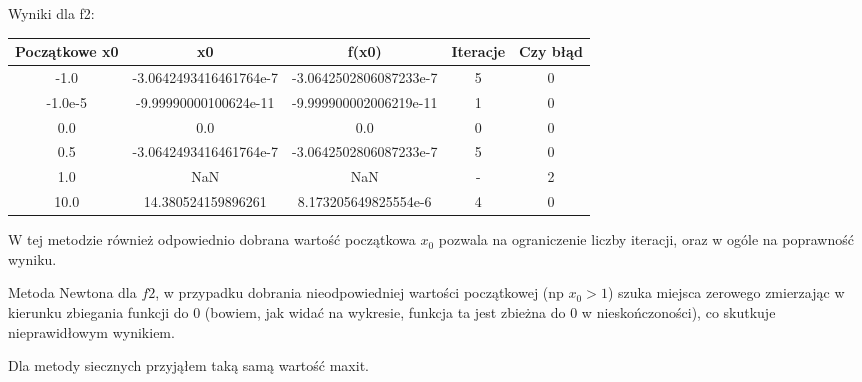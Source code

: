 \documentclass[15pt, a4paper]{article}
\begin{document}
\noindent Wyniki dla f2:
\begin{table}[ht]
\begin{adjustbox}{max width=\textwidth}
\begin{tabular}{|c|c|c|c|c|}
    \hline
    \textbf{Początkowe x0} & \textbf{x0} & \textbf{f(x0)} & \textbf{Iteracje} & \textbf{Czy błąd} \\
    \hline
    -1.0 & -3.0642493416461764e-7 & -3.0642502806087233e-7 & 5 & 0 \\
    \hline
    -1.0e-5 & -9.99990000100624e-11 & -9.999900002006219e-11 & 1 & 0 \\
    \hline
    0.0 & 0.0 & 0.0 & 0 & 0 \\
    \hline
    0.5 & -3.0642493416461764e-7 & -3.0642502806087233e-7 & 5 & 0 \\
    \hline
    1.0 & NaN & NaN & - & 2 \\
    \hline
    10.0 & 14.380524159896261 & 8.173205649825554e-6 & 4 & 0 \\
    \hline
\end{tabular}
\end{adjustbox}
\end{table}



\noindent W tej metodzie również odpowiednio dobrana wartość początkowa \( x_0 \) pozwala na ograniczenie liczby iteracji, oraz w ogóle na poprawność wyniku. 


Metoda Newtona dla \(f2\), w przypadku dobrania nieodpowiedniej wartości początkowej (np \(x_0 > 1\)) szuka miejsca zerowego zmierzając w kierunku zbiegania funkcji do 0 (bowiem, jak widać na wykresie, funkcja ta jest zbieżna do 0 w nieskończoności), co skutkuje nieprawidłowym wynikiem. 


\noindent Dla metody siecznych przyjąłem taką samą wartość maxit.
\end{document}
